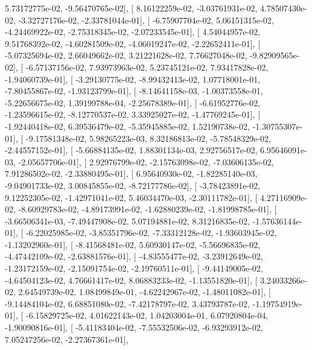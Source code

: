 \documentclass{article}
\begin{document}
          5.73172775e-02,  -9.56470765e-02],
       [  8.16122259e-02,  -3.03761931e-02,   4.78507430e-02,
         -3.32727176e-02,  -2.33781044e-01],
       [ -6.75907704e-02,   5.06151315e-02,  -4.24469922e-02,
         -2.75318345e-02,  -2.07233545e-01],
       [  4.54044957e-02,   9.51768392e-02,  -4.60281509e-02,
         -4.06019247e-02,  -2.22652411e-01],
       [ -5.07325694e-02,   2.66049662e-02,   3.21221628e-02,
          7.76627048e-02,  -9.82909565e-02],
       [ -6.57137156e-02,   7.93973963e-02,   5.23745121e-02,
          7.93417828e-02,  -1.94060739e-01],
       [ -3.29130775e-02,  -8.99432413e-02,   1.07718001e-01,
         -7.80455867e-02,  -1.93123799e-01],
       [ -8.14641158e-03,  -1.00373558e-01,  -5.22656675e-02,
          1.39199788e-04,  -2.25678389e-01],
       [ -6.61952776e-02,  -1.23596615e-02,  -8.12770537e-02,
          3.33925027e-02,  -1.47769245e-01],
       [ -1.92440418e-02,   6.39536479e-02,  -5.35945885e-02,
          1.52190738e-02,  -1.30755307e-01],
       [ -9.17581348e-02,   5.98265223e-03,   8.32186813e-02,
         -5.78548329e-02,  -2.44557152e-01],
       [ -5.66884135e-02,   1.88301134e-03,   2.92756517e-02,
          6.95646091e-03,  -2.05657706e-01],
       [  2.92976799e-02,  -2.15763098e-02,  -7.03606135e-02,
          7.91286502e-02,  -2.33880495e-01],
       [  6.95640930e-02,  -1.82285140e-03,  -9.04901733e-02,
          3.00845855e-02,  -8.72177786e-02],
       [ -3.78423891e-02,   9.12252305e-02,  -1.42971041e-02,
          5.46034470e-03,  -2.30111782e-01],
       [  4.27116909e-02,  -8.60929783e-02,  -4.89173991e-02,
         -1.62880239e-02,  -1.81998785e-01],
       [ -3.66506341e-03,  -7.49447908e-02,   5.07194881e-02,
          8.31216835e-02,  -1.57636144e-01],
       [ -6.22025985e-02,  -3.85351796e-02,  -7.33312128e-02,
         -1.93603945e-02,  -1.13202960e-01],
       [ -8.41568481e-02,   5.60930147e-02,  -5.56696835e-02,
         -4.47442109e-02,  -2.63881576e-01],
       [ -4.83555477e-02,  -3.23912649e-02,  -1.23172159e-02,
         -2.15091754e-02,  -2.19760511e-01],
       [ -9.44149005e-02,  -4.64504123e-02,   4.76661417e-02,
          8.06883233e-02,  -1.13551820e-01],
       [  3.24033266e-02,   2.64549739e-02,   1.08499849e-01,
         -4.62242967e-02,  -1.48011082e-01],
       [ -9.14484104e-02,   6.68851080e-02,  -7.42178797e-02,
          3.43793787e-02,  -1.19754919e-01],
       [ -6.15829725e-02,   4.01622143e-02,   1.04203004e-01,
          6.07920804e-04,  -1.90090816e-01],
       [ -5.41183404e-02,  -7.55532506e-02,  -6.93293912e-02,
          7.05247256e-02,  -2.27367361e-01],
\end{document}
